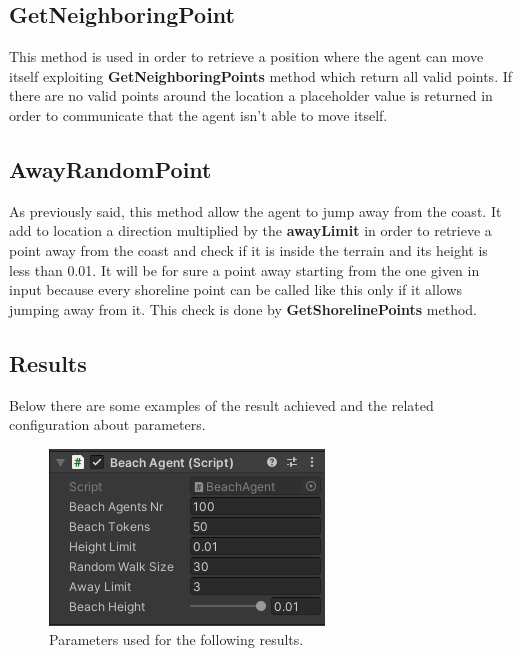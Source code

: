\documentclass[12pt]{article}
\begin{document}
    \subsection{GetNeighboringPoint}
    This method is used in order to retrieve a position where the agent can move itself exploiting \textbf{GetNeighboringPoints} method which return all
    valid points. If there are no valid points around the location a placeholder value is returned in order to communicate that the agent isn't able
    to move itself.

    \subsection{AwayRandomPoint}
    As previously said, this method allow the agent to jump away from the coast. It add to location a direction multiplied by the \textbf{awayLimit} in order
    to retrieve a point away from the coast and check if it is inside the terrain and its height is less than 0.01. It will be for sure a point away starting
    from the one given in input because every shoreline point can be called like this only if it allows jumping away from it. This check is done by 
    \textbf{GetShorelinePoints} method.

    \subsection{Results}
    Below there are some examples of the result achieved and the related configuration about parameters.

    \begin{figure}[H]
        \centering
        \includegraphics[scale = 0.8]{images/Beach agent/Parameters 1}
        \caption{Parameters used for the following results.}
    \end{figure}
\end{document}
